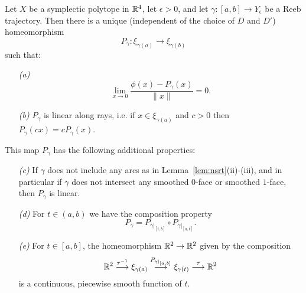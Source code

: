 \begin{lemma}
\label{lem:plrm}
Let $X$ be a symplectic polytope in ${\mathbb R}^4$, let $\epsilon>0$, and let $\gamma:[a,b]\to Y_\epsilon$ be a Reeb trajectory. Then there is a unique (independent of the choice of $D$ and $D'$) homeomorphism
\[
P_\gamma:\xi_{\gamma(a)} \longrightarrow \xi_{\gamma(b)}
\]
such that:
\begin{itemize}
\item[\emph{(a)}]
\begin{equation}
\label{eqn:uniqueP}
\lim_{x\to 0}\frac{\phi(x)-P_\gamma(x)}{\|x\|}=0.
\end{equation}
\item[\emph{(b)}] $P_\gamma$ is linear along rays, i.e. if $x\in \xi_{\gamma(a)}$ and $c>0$ then $P_\gamma(cx) = cP_\gamma(x)$.
\end{itemize}
This map $P_\gamma$ has the following additional properties:
\begin{itemize}
\item[\emph{(c)}]
If $\gamma$ does not include any arcs as in Lemma~\ref{lem:nsrt}(ii)-(iii), and in particular if $\gamma$ does not intersect any smoothed $0$-face or smoothed $1$-face, then $P_\gamma$ is linear.
\item[\emph{(d)}]
For $t\in(a,b)$ we have the composition property
\[
P_\gamma = P_{\gamma|_{[t,b]}} \circ P_{\gamma|_{[a,t]}}.
\]
\item[\emph{(e)}]
For $t\in [a,b]$, the homeomorphism ${\mathbb R}^2\to{\mathbb R}^2$ given by the composition
\[
{\mathbb R}^2 \stackrel{\tau^{-1}}{\longrightarrow} \xi_{\gamma(a)} \stackrel{P_{\gamma|_{[a,b]}}}{\longrightarrow} \xi_{\gamma(t)} \stackrel{\tau}{\longrightarrow} {\mathbb R}^2
\]
is a continuous, piecewise smooth function of $t$.
\end{itemize}
\end{lemma}

